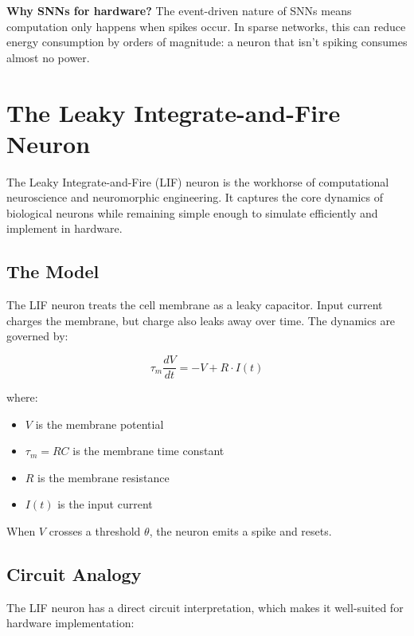 \documentclass[11pt,a4paper]{article}
\begin{document}
\begin{tcolorbox}[keypoint]
\textbf{Why SNNs for hardware?} The event-driven nature of SNNs means computation only happens when spikes occur. In sparse networks, this can reduce energy consumption by orders of magnitude: a neuron that isn't spiking consumes almost no power.
\end{tcolorbox}

\section{The Leaky Integrate-and-Fire Neuron}

The Leaky Integrate-and-Fire (LIF) neuron is the workhorse of computational neuroscience and neuromorphic engineering. It captures the core dynamics of biological neurons while remaining simple enough to simulate efficiently and implement in hardware.

\subsection{The Model}

The LIF neuron treats the cell membrane as a leaky capacitor. Input current charges the membrane, but charge also leaks away over time. The dynamics are governed by:

\begin{equation}
    \tau_m \frac{dV}{dt} = -V + R \cdot I(t)
\end{equation}

where:
\begin{itemize}
    \item $V$ is the membrane potential
    \item $\tau_m = RC$ is the membrane time constant
    \item $R$ is the membrane resistance
    \item $I(t)$ is the input current
\end{itemize}

When $V$ crosses a threshold $\theta$, the neuron emits a spike and resets.

\subsection{Circuit Analogy}

The LIF neuron has a direct circuit interpretation, which makes it well-suited for hardware implementation:
\end{document}
